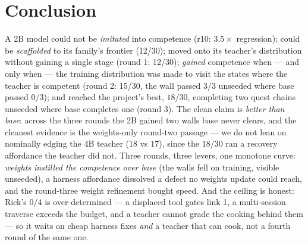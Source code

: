 \documentclass[11pt]{article}
\begin{document}
\section{Conclusion}
A 2B model could not be \emph{imitated} into competence (r10: $3.5\times$ regression); could be
\emph{scaffolded} to its family's frontier (12/30); moved onto its teacher's distribution without
gaining a single stage (round 1: 12/30); \emph{gained} competence when --- and only when --- the
training distribution was made to visit the states where the teacher is competent (round 2: 15/30,
the wall passed $3/3$ unseeded where base passed $0/3$); and reached the project's best, $18/30$,
completing two quest chains unseeded where base completes one (round 3). The clean claim is
\emph{better than base}: across the three rounds the 2B gained two walls base never clears, and the
cleanest evidence is the weights-only round-two passage --- we do not lean on nominally edging the
4B teacher ($18$ vs $17$), since the $18/30$ ran a recovery affordance the teacher did not. Three
rounds, three levers, one monotone curve: \emph{weights instilled the competence over base} (the
walls fell on training, visible unseeded), a harness affordance dissolved a defect no weights
update could reach, and the round-three weight refinement bought speed. And the ceiling is honest:
Rick's $0/4$ is over-determined --- a displaced tool gates link 1, a multi-session traverse exceeds
the budget, and a teacher cannot grade the cooking behind them --- so it waits on cheap harness
fixes \emph{and} a teacher that can cook, not a fourth round of the same one.
\end{document}
